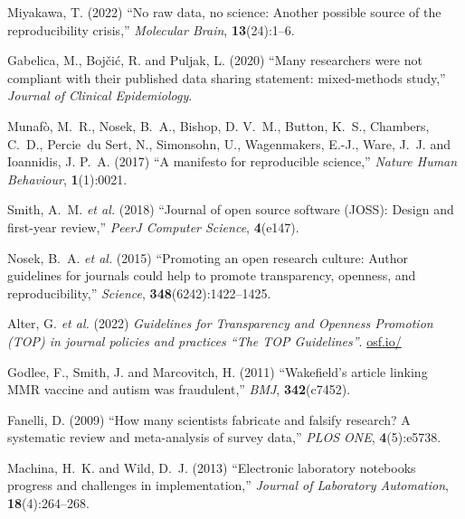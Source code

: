 \documentclass{comjnl}
\begin{document}
{\begin{thebibliography}{100}
Miyakawa, T. (2022) ``No raw data, no science: {Another} possible source of the
  reproducibility crisis,'' {\em Molecular Brain}, \textbf{13}(24):1--6.
\newblock {}

Gabelica, M., Boj{\v c}i{\' c}, R. and Puljak, L. (2020) ``Many researchers
  were not compliant with their published data sharing statement: mixed-methods
  study,'' {\em Journal of Clinical Epidemiology}.
\newblock {}

Munaf{\`o}, M.~R., Nosek, B.~A., Bishop, D. V.~M., Button, K.~S., Chambers,
  C.~D., Percie~du Sert, N., Simonsohn, U., Wagenmakers, E.-J., Ware, J.~J. and
  Ioannidis, J. P.~A. (2017) ``A manifesto for reproducible science,'' {\em
  Nature Human Behaviour}, \textbf{1}(1):0021.
\newblock {}

Smith, A.~M. \emph{et al.} (2018) ``Journal of open source software ({JOSS}):
  Design and first-year review,'' {\em PeerJ Computer Science},
  \textbf{4}(e147).
\newblock {}

Nosek, B.~A. \emph{et al.} (2015) ``Promoting an open research culture:
  {A}uthor guidelines for journals could help to promote transparency,
  openness, and reproducibility,'' {\em Science},
  \textbf{348}(6242):1422--1425.
\newblock {}

Alter, G. \emph{et al.} (2022) {\em Guidelines for {Transparency} and
  {Openness} {Promotion} {(TOP)} in journal policies and practices ``{The}
  {TOP} {Guidelines}''}.
\newblock \url{osf.io/}

Godlee, F., Smith, J. and Marcovitch, H. (2011) ``Wakefield's article linking
  {MMR} vaccine and autism was fraudulent,'' {\em BMJ}, \textbf{342}(c7452).
\newblock {}

Fanelli, D. (2009) ``How many scientists fabricate and falsify research? {A}
  systematic review and meta-analysis of survey data,'' {\em {PLOS ONE}},
  \textbf{4}(5):e5738.
\newblock {}

Machina, H.~K. and Wild, D.~J. (2013) ``Electronic laboratory notebooks
  progress and challenges in implementation,'' {\em Journal of Laboratory
  Automation}, \textbf{18}(4):264--268.
\newblock {}


\end{thebibliography}}
\end{document}
